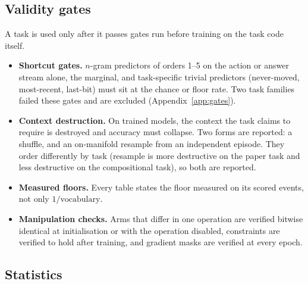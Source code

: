 \documentclass[10pt]{article}
\begin{document}
\subsection{Validity gates}
\label{sec:gates}

A task is used only after it passes gates run before training on the task code itself.
\begin{itemize}
\item \textbf{Shortcut gates.} $n$-gram predictors of orders 1--5 on the action or answer stream
alone, the marginal, and task-specific trivial predictors (never-moved, most-recent, last-bit) must
sit at the chance or floor rate. Two task families failed these gates and are excluded
(Appendix~\ref{app:gates}).
\item \textbf{Context destruction.} On trained models, the context the task claims to require is
destroyed and accuracy must collapse. Two forms are reported: a shuffle, and an on-manifold resample
from an independent episode. They order differently by task (resample is more destructive on the
paper task and less destructive on the compositional task), so both are reported.
\item \textbf{Measured floors.} Every table states the floor measured on its scored events, not only
$1/\text{vocabulary}$.
\item \textbf{Manipulation checks.} Arms that differ in one operation are verified bitwise identical
at initialisation or with the operation disabled, constraints are verified to hold after training,
and gradient masks are verified at every epoch.
\end{itemize}

\subsection{Statistics}
\label{sec:stats}
\end{document}
